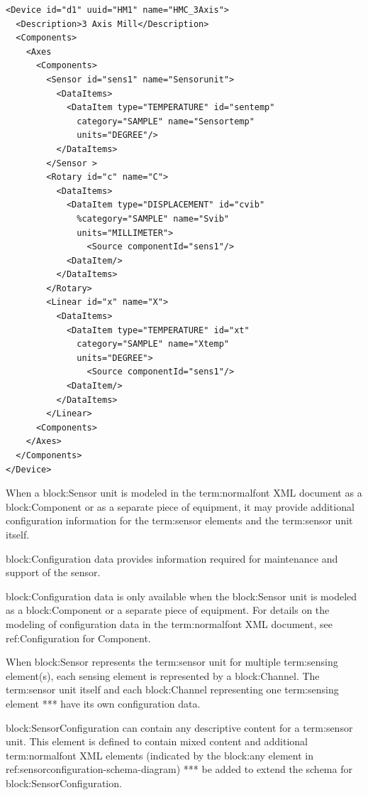 \begin{lstlisting}[firstnumber=1,escapechar=|,%
    caption={Example of Sensor Unit with Sensing Element}, label={lst:example-of-sensor-with-sensing-elements}]
<Device id="d1" uuid="HM1" name="HMC_3Axis">
  <Description>3 Axis Mill</Description>
  <Components>
    <Axes
      <Components>
        <Sensor id="sens1" name="Sensorunit">
          <DataItems>
            <DataItem type="TEMPERATURE" id="sentemp"
              category="SAMPLE" name="Sensortemp" 
              units="DEGREE"/> 
          </DataItems>
        </Sensor >
        <Rotary id="c" name="C">
          <DataItems>
            <DataItem type="DISPLACEMENT" id="cvib"
              %category="SAMPLE" name="Svib" 
              units="MILLIMETER">
                <Source componentId="sens1"/>
            <DataItem/>
          </DataItems>
        </Rotary>
        <Linear id="x" name="X">
          <DataItems>
            <DataItem type="TEMPERATURE" id="xt" 
              category="SAMPLE" name="Xtemp" 
              units="DEGREE">
                <Source componentId="sens1"/>
            <DataItem/>
          </DataItems>
        </Linear>
      <Components>
    </Axes>
  </Components>
</Device>
\end{lstlisting}

When a {block:Sensor} unit is modeled in the {term:normalfont XML} document as a {block:Component} or as a separate piece of equipment, it may provide additional configuration information for the {term:sensor elements} and the {term:sensor unit} itself.  

{block:Configuration} data provides information required for maintenance and support of the sensor.

{block:Configuration} data is only available when the {block:Sensor} unit is modeled as a {block:Component} or a separate piece of equipment. For details on the modeling of configuration data in the {term:normalfont XML} document, see {ref:Configuration for Component}.

When {block:Sensor} represents the {term:sensor unit} for multiple {term:sensing element}(s), each sensing element is represented by a {block:Channel}.   The {term:sensor unit} itself and each {block:Channel} representing one {term:sensing element} **\may** have its own configuration data.

{block:SensorConfiguration} can contain any descriptive content for a {term:sensor unit}.  This element is defined to contain mixed content and additional {term:normalfont XML} elements (indicated by the {block:any} element in {ref:sensorconfiguration-schema-diagram}) **\may** be added to extend the schema for {block:SensorConfiguration}.



